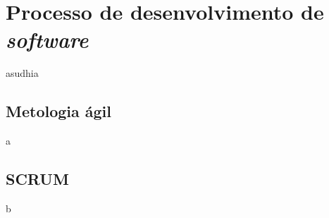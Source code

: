 \section{Processo de desenvolvimento de \textit{software}}

asudhia

\subsection{Metologia ágil}
\label{fundSWAgil}

a

\subsection{SCRUM}
\label{fundSWSCRUM}

b